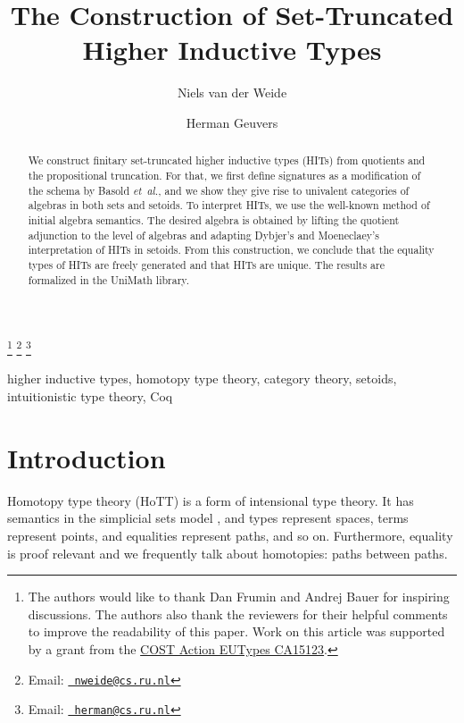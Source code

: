 \documentclass[9pt]{entcs}
\newcommand{\etal}{\emph{et~al.}}
\newcommand{\0}{\textbf{0}} %
\begin{document}
\begin{frontmatter}
  \title{The Construction of Set-Truncated Higher Inductive Types} \author{Niels van der Weide
		}
  \address{Institute for Computation and Information Sciences\\ Radboud Universiteit\\
  	Nijmegen, The Netherlands}
  \author{Herman Geuvers}
  \address{Institute for Computation and Information Sciences\\ Radboud Universiteit\\
  	Nijmegen, The Netherlands}
  \thanks[ALL]{The authors would like to thank Dan Frumin and Andrej Bauer for inspiring discussions. The authors also thank the reviewers for their helpful comments to improve the readability of this paper. Work on this article was supported by a grant from the \href{https://eutypes.cs.ru.nl/}{COST Action EUTypes CA15123}.} \thanks[myemail]{Email:
  	\href{mailto:nweide@cs.ru.nl} {\texttt{\normalshape
  			nweide@cs.ru.nl}}} \thanks[coemail]{Email:
  	\href{mailto:herman@cs.ru.nl} {\texttt{\normalshape
  			herman@cs.ru.nl}}}
\begin{abstract} 
  We construct finitary set-truncated higher inductive types (HITs) from quotients and the propositional truncation.
  For that, we first define signatures as a modification of the schema by Basold \etal, and we show they give rise to univalent categories of algebras in both sets and setoids.
  To interpret HITs, we use the well-known method of initial algebra semantics.
  The desired algebra is obtained by lifting the quotient adjunction to the level of algebras and adapting Dybjer's and Moeneclaey's interpretation of HITs in setoids.
  From this construction, we conclude that the equality types of HITs are freely generated and that HITs are unique.
  The results are formalized in the UniMath library.
\end{abstract}
\begin{keyword}
higher inductive types, homotopy type theory, category theory, setoids, intuitionistic type theory, Coq
\end{keyword}
\end{frontmatter}
\section{Introduction}
\label{intro}
Homotopy type theory (HoTT) is a form of intensional type theory. 
It has semantics in the simplicial sets model \cite{simpset}, and types represent spaces, terms represent points, and equalities represent paths, and so on.
Furthermore, equality is proof relevant and we frequently talk about homotopies: paths between paths.
\end{document}
